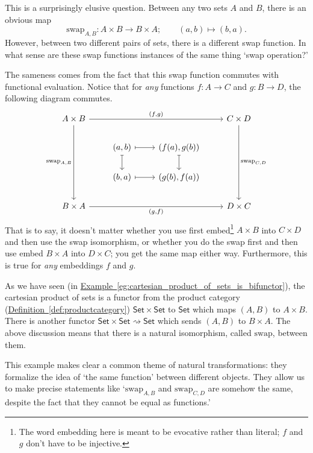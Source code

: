 \documentclass[notes.tex]{subfiles}
\begin{document}
This is a surprisingly elusive question. Between any two sets $A$ and $B$, there is an obvious map
\begin{equation*}
  \mathrm{swap}_{A,B}\colon A \times B \to B \times A; \qquad (a, b) \mapsto (b, a).
\end{equation*}
However, between two different pairs of sets, there is a different swap function. In what sense are these swap functions instances of the same thing `swap operation?'

The sameness comes from the fact that this swap function commutes with functional evaluation. Notice that for \emph{any} functions $f\colon A \to C$ and $g\colon B \to D$, the following diagram commutes.
\begin{equation*}
  \begin{tikzcd}
    A \times B
    \arrow[rrr, "{(f, g)}"]
    \arrow[ddd, swap, "{\mathrm{swap}_{A, B}}"]
    &&& C \times D
    \arrow[ddd, "{\mathrm{swap}_{C, D}}"]
    \\
    & (a, b)
    \arrow[r, mapsto]
    \arrow[d, mapsto]
    & (f(a), g(b))
    \arrow[d, mapsto]
    \\
    & (b, a)
    \arrow[r, mapsto]
    & (g(b), f(a))
    \\
    B \times A
    \arrow[rrr, swap, "{(g, f)}"]
    &&& D \times C
  \end{tikzcd}
\end{equation*}
That is to say, it doesn't matter whether you use first embed\footnote{The word embedding here is meant to be evocative rather than literal; $f$ and $g$ don't have to be injective.} $A \times B$ into $C \times D$ and then use the swap isomorphism, or whether you do the swap first and then use embed $B \times A$ into $D \times C$; you get the same map either way. Furthermore, this is true for \emph{any} embeddings $f$ and $g$.

As we have seen (in \hyperref[eg:cartesian_product_of_sets_is_bifunctor]{Example~\ref*{eg:cartesian_product_of_sets_is_bifunctor}}), the cartesian product of sets is a functor from the product category (\hyperref[def:productcategory]{Definition~\ref*{def:productcategory}}) $\mathsf{Set} \times \mathsf{Set}$ to $\mathsf{Set}$ which maps $(A, B)$ to $A \times B$. There is another functor $\mathsf{Set} \times \mathsf{Set} \rightsquigarrow \mathsf{Set}$ which sends $(A, B)$ to $B \times A$. The above discussion means that there is a natural isomorphism, called $\mathrm{swap}$, between them.

This example makes clear a common theme of natural transformations: they formalize the idea of `the same function' between different objects. They allow us to make precise statements like `$\mathrm{swap}_{A, B}$ and $\mathrm{swap}_{C, D}$ are somehow the same, despite the fact that they cannot be equal as functions.'
\end{document}
